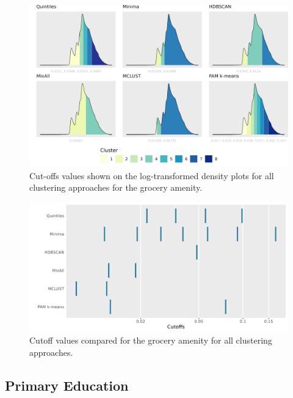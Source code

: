 \documentclass[11pt, a4paper]{article}
\begin{document}
\begin{figure}[H]
\centering
\includegraphics[width=\textwidth]{./cutoffs/by_amenity/Grocery_cutoffs.png}
\caption[Grocery cutoffs]{Cut-offs values shown on the log-transformed density plots for all clustering approaches for the grocery amenity.}\label{grocerycutoffs}
\end{figure}




\begin{figure}[H]
\centering
\includegraphics[width=\textwidth]{./cutoff_ticks/Grocery_ticks.png}
\caption[Grocery cutoff comparison]{Cutoff values compared for the grocery amenity for all clustering approaches.}\label{groceryticks}
\end{figure}









\pagebreak
\justifying
\subsection{Primary Education}
\end{document}
